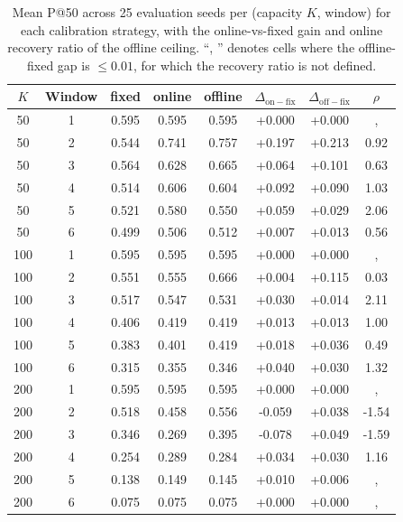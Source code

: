 \begin{table}[!t]
 \caption{Mean P@50 across 25 evaluation seeds per (capacity $K$, window) for each calibration strategy, with the online-vs-fixed gain and online recovery ratio of the offline ceiling. ``, '' denotes cells where the offline-fixed gap is $\leq 0.01$, for which the recovery ratio is not defined.}
 \label{tab:main}
 \centering
 \small
 \setlength{\tabcolsep}{6pt}
 \begin{tabular}{cc ccc cc c}
 \toprule
 $K$ & Window & fixed & online & offline & $\Delta_{\mathrm{on\!-\!fix}}$ & $\Delta_{\mathrm{off\!-\!fix}}$ & $\rho$ \\
 \midrule
 50 & 1 & 0.595 & 0.595 & 0.595 & +0.000 & +0.000 &, \\
 50 & 2 & 0.544 & 0.741 & 0.757 & +0.197 & +0.213 & 0.92 \\
 50 & 3 & 0.564 & 0.628 & 0.665 & +0.064 & +0.101 & 0.63 \\
 50 & 4 & 0.514 & 0.606 & 0.604 & +0.092 & +0.090 & 1.03 \\
 50 & 5 & 0.521 & 0.580 & 0.550 & +0.059 & +0.029 & 2.06 \\
 50 & 6 & 0.499 & 0.506 & 0.512 & +0.007 & +0.013 & 0.56 \\
 \midrule
 100 & 1 & 0.595 & 0.595 & 0.595 & +0.000 & +0.000 &, \\
 100 & 2 & 0.551 & 0.555 & 0.666 & +0.004 & +0.115 & 0.03 \\
 100 & 3 & 0.517 & 0.547 & 0.531 & +0.030 & +0.014 & 2.11 \\
 100 & 4 & 0.406 & 0.419 & 0.419 & +0.013 & +0.013 & 1.00 \\
 100 & 5 & 0.383 & 0.401 & 0.419 & +0.018 & +0.036 & 0.49 \\
 100 & 6 & 0.315 & 0.355 & 0.346 & +0.040 & +0.030 & 1.32 \\
 \midrule
 200 & 1 & 0.595 & 0.595 & 0.595 & +0.000 & +0.000 &, \\
 200 & 2 & 0.518 & 0.458 & 0.556 & -0.059 & +0.038 & -1.54 \\
 200 & 3 & 0.346 & 0.269 & 0.395 & -0.078 & +0.049 & -1.59 \\
 200 & 4 & 0.254 & 0.289 & 0.284 & +0.034 & +0.030 & 1.16 \\
 200 & 5 & 0.138 & 0.149 & 0.145 & +0.010 & +0.006 &, \\
 200 & 6 & 0.075 & 0.075 & 0.075 & +0.000 & +0.000 &, \\
 \bottomrule
 \end{tabular}
\end{table}
